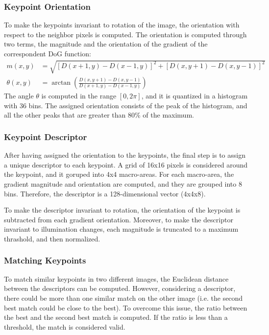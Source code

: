 \subsubsection*{Keypoint Orientation}
To make the keypoints invariant to rotation of the image, the orientation with 
respect to the neighbor pixels is computed. The orientation is computed through 
two terms, the magnitude and the orientation of the gradient of the 
correspondent DoG function:
\begin{align*}
    m(x, y) &= \sqrt{\left[D(x+1, y) - D(x-1, y)\right]^2 + \left[D(x, y+1) - D(x, y-1)\right]^2} \\
    \theta(x, y) &= \arctan\left(\frac{D(x, y+1) - D(x, y-1)}{D(x+1, y) - D(x-1, y)}\right)
\end{align*}
The angle $\theta$ is computed in the range $[0, 2\pi]$, and it is quantized 
in a histogram with 36 bins. The assigned orientation consists of the peak of 
the histogram, and all the other peaks that are greater than 80\% of the maximum.

\subsubsection*{Keypoint Descriptor}
After having assigned the orientation to the keypoints, the final step is to 
assign a unique descriptor to each keypoint. 
A grid of 16x16 pixels is considered around the keypoint, and it goruped into 
4x4 macro-areas. For each macro-area, the gradient magnitude and orientation 
are computed, and they are grouped into 8 bins. Therefore, the descriptor is 
a 128-dimensional vector (4x4x8).

To make the descriptor invariant to rotation, the orientation of the keypoint 
is subtracted from each gradient orientation.
Moreover, to make the descriptor invariant to illumination changes, each 
magnitude is truncated to a maximum thrashold, and then normalized.

\subsubsection*{Matching Keypoints}
To match similar keypoints in two different images, the Euclidean distance 
between the descriptors can be computed. However, considering a descriptor, 
there could be more than one similar match on the other image (i.e. the second 
best match could be close to the best). To overcome this issue, the ratio between 
the best and the second best match is computed. If the ratio is less than a 
threshold, the match is considered valid.

